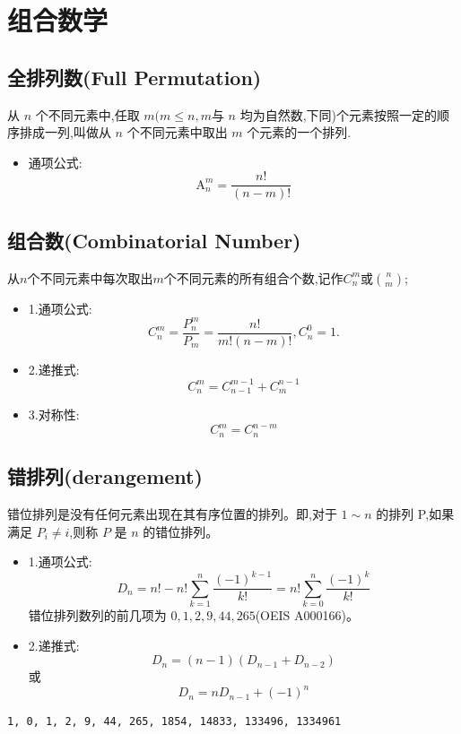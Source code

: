 \section{组合数学}
\subsection{全排列数(Full Permutation)}
从 $n$ 个不同元素中,任取 $m(m\leq n,m$与 $n$ 均为自然数,下同)个元素按照一定的顺序排成一列,叫做从 $n$ 个不同元素中取出 $m$ 个元素的一个排列.

\begin{itemize}
    \item 通项公式: 
			$$\mathrm A_n^m = \frac{n!}{(n - m)!}$$
\end{itemize}

\subsection{组合数(Combinatorial Number)}
从$n$个不同元素中每次取出$m$个不同元素的所有组合个数,记作$C^m_n$或$\binom{n}{m}$;

\begin{itemize}
    \item 1.通项公式: 
		$$C^m_n = \frac{P_n^m}{P_m} = \frac{n!}{m!(n - m)!},C^0_n = 1.$$
	\item 2.递推式:
		$$C^m_n = C_{n-1}^{m-1}+C^{n-1}_m$$
	\item 3.对称性:
		$$C^m_n = C^{n - m}_{n}$$
\end{itemize}

\subsection{错排列(derangement)}
错位排列是没有任何元素出现在其有序位置的排列。即,对于 $1\sim n$ 的排列 P,如果满足 $P_i\neq i$,则称 $P$ 是 $n$ 的错位排列。

\begin{itemize}
    \item 1.通项公式:
		$$D_n=n!-n!\sum_{k=1}^n\frac{(-1)^{k-1} }{k!}=n!\sum_{k=0}^n\frac{(-1)^k}{k!}$$
		错位排列数列的前几项为 $0,1,2,9,44,265$(OEIS A000166)。
	\item 2.递推式:
			$$D_n=(n-1)(D_{n-1}+D_{n-2})$$
			或
			$$D_n=nD_{n-1}+{(-1)}^n$$
\end{itemize}
\begin{lstlisting}[caption={}]
1, 0, 1, 2, 9, 44, 265, 1854, 14833, 133496, 1334961
\end{lstlisting}

